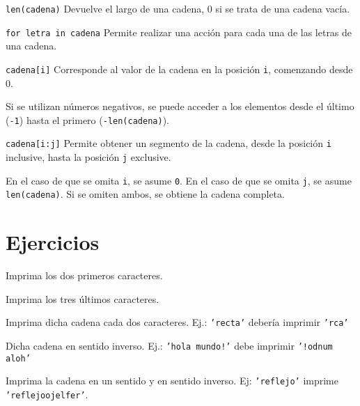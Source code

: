 \begin{referencia_python}

\begin{sintaxis}{\lstinline!len(cadena)!}
Devuelve el largo de una cadena, 0 si se trata de una cadena vacía.
\end{sintaxis}

\begin{sintaxis}{\lstinline!for letra in cadena!}
Permite realizar una acción para cada una de las letras de una cadena.
\end{sintaxis}

\begin{sintaxis}{\lstinline!cadena[i]!}
Corresponde al valor de la cadena en la posición \lstinline!i!, comenzando
desde 0.

Si se utilizan números negativos, se puede acceder a los
elementos desde el último (\lstinline!-1!) hasta el primero
(\lstinline!-len(cadena)!).
\end{sintaxis}

\begin{sintaxis}{\lstinline!cadena[i:j]!}
Permite obtener un segmento de la cadena, desde la posición \lstinline!i!
inclusive, hasta la posición \lstinline!j! exclusive.

En el caso de que se omita \lstinline!i!, se asume \lstinline!0!.  En el
caso de que se omita \lstinline!j!, se asume \lstinline!len(cadena)!.  Si
se omiten ambos, se obtiene la cadena completa.
\end{sintaxis}

\end{referencia_python}


\newpage
\section{Ejercicios}

\begin{partes}
\item Imprima los dos primeros caracteres.
\item Imprima los tres últimos caracteres.
\item Imprima dicha cadena cada dos caracteres. Ej.: \texttt{'recta'} debería
imprimir \texttt{'rca'}
\item Dicha cadena en sentido inverso. Ej.: \texttt{'hola mundo!'} debe
imprimir \texttt{'!odnum aloh'}
\item Imprima la cadena en un sentido y en sentido inverso. Ej:
\texttt{'reflejo'} imprime \texttt{'reflejoojelfer'}.
\end{partes}


